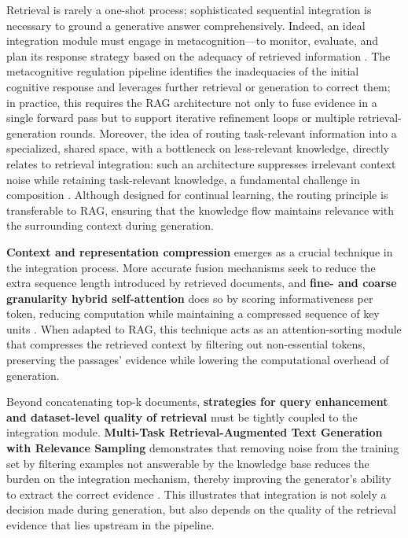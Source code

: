 \documentclass[11pt]{article}
\begin{document}
Retrieval is rarely a one-shot process; sophisticated sequential integration is necessary to ground a generative answer comprehensively. Indeed, an ideal integration module must engage in metacognition---to monitor, evaluate, and plan its response strategy based on the adequacy of retrieved information \cite{ref44}. The metacognitive regulation pipeline identifies the inadequacies of the initial cognitive response and leverages further retrieval or generation to correct them; in practice, this requires the RAG architecture not only to fuse evidence in a single forward pass but to support iterative refinement loops or multiple retrieval-generation rounds. Moreover, the idea of routing task-relevant information into a specialized, shared space, with a bottleneck on less-relevant knowledge, directly relates to retrieval integration: such an architecture suppresses irrelevant context noise while retaining task-relevant knowledge, a fundamental challenge in composition \cite{ref45}. Although designed for continual learning, the routing principle is transferable to RAG, ensuring that the knowledge flow maintains relevance with the surrounding context during generation.

\textbf{Context and representation compression} emerges as a crucial technique in the integration process. More accurate fusion mechanisms seek to reduce the extra sequence length introduced by retrieved documents, and \textbf{fine- and coarse granularity hybrid self-attention} does so by scoring informativeness per token, reducing computation while maintaining a compressed sequence of key units \cite{ref40}. When adapted to RAG, this technique acts as an attention-sorting module that compresses the retrieved context by filtering out non-essential tokens, preserving the passages' evidence while lowering the computational overhead of generation.

Beyond concatenating top-k documents, \textbf{strategies for query enhancement and dataset-level quality of retrieval} must be tightly coupled to the integration module. \textbf{Multi-Task Retrieval-Augmented Text Generation with Relevance Sampling} demonstrates that removing noise from the training set by filtering examples not answerable by the knowledge base reduces the burden on the integration mechanism, thereby improving the generator's ability to extract the correct evidence \cite{ref37}. This illustrates that integration is not solely a decision made during generation, but also depends on the quality of the retrieval evidence that lies upstream in the pipeline.
\end{document}
